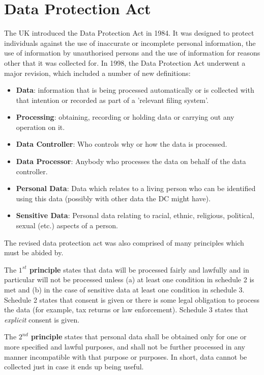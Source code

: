 \documentclass{article}
\begin{document}
	\section{Data Protection Act}
	The UK introduced the Data Protection Act in 1984. It was designed to protect individuals against the use of inaccurate or incomplete personal information, the use of information by unauthorised persons and the use of information for reasons other that it was collected for. In 1998, the Data Protection Act underwent a major revision, which included a number of new definitions:
	\begin{itemize}
		\item \textbf{Data}: information that is being processed automatically or is collected with that intention or recorded as part of a 'relevant filing system'.
		\item \textbf{Processing}: obtaining, recording or holding data or carrying out any operation on it.
		\item \textbf{Data Controller}: Who controls why or how the data is processed.
		\item \textbf{Data Processor}: Anybody who processes the data on behalf of the data controller.
		\item \textbf{Personal Data}: Data which relates to a living person who can be identified using this data (possibly with other data the DC might have).
		\item \textbf{Sensitive Data}: Personal data relating to racial, ethnic, religious, political, sexual (etc.) aspects of a person.
	\end{itemize}
	
	The revised data protection act was also comprised of many principles which must be abided by.
	
	\par 
	The \textbf{$1^{st}$ principle} states that data will be processed fairly and lawfully and in particular will not be processed unless (a) at least one condition in schedule 2 is met and (b) in the case of sensitive data at least one condition in schedule 3. Schedule 2 states that consent is given or there is some legal obligation to process the data (for example, tax returns or law enforcement). Schedule 3 states that \textit{explicit} consent is given.
	
	\par The \textbf{$2^{nd}$ principle} states that personal data shall be obtained only for one or more specified and lawful purposes, and shall not be further processed in any manner incompatible with that purpose or purposes. In short, data cannot be collected just in case it ends up being useful.	
	
\end{document}
